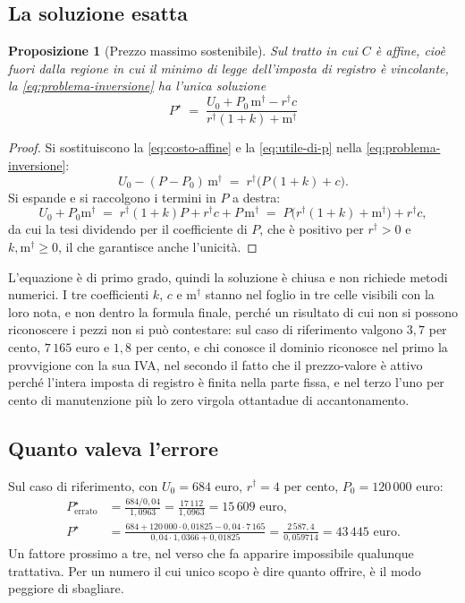 \documentclass[11pt,a4paper]{article}
\theoremstyle{definition}
\theoremstyle{plain}
\newtheorem{proposizione}[definizione]{Proposizione}
\begin{document}
\subsection{La soluzione esatta}

\begin{proposizione}[Prezzo massimo sostenibile]
Sul tratto in cui $C$ è affine, cioè fuori dalla regione in cui il minimo di legge dell'imposta di registro è vincolante, la \eqref{eq:problema-inversione} ha l'unica soluzione
\begin{equation}
\boxed{\;
P^\star \;=\; \frac{U_0 + P_0\,\mathrm{m}^\dagger - r^\dagger c}{r^\dagger (1+k) + \mathrm{m}^\dagger}\;}
\label{eq:pmax}
\end{equation}
\end{proposizione}

\begin{proof}
Si sostituiscono la \eqref{eq:costo-affine} e la \eqref{eq:utile-di-p} nella \eqref{eq:problema-inversione}:
\[
U_0 - (P-P_0)\,\mathrm{m}^\dagger \;=\; r^\dagger\big(P(1+k)+c\big).
\]
Si espande e si raccolgono i termini in $P$ a destra:
\[
U_0 + P_0 \mathrm{m}^\dagger \;=\; r^\dagger(1+k)P + r^\dagger c + P\,\mathrm{m}^\dagger
\;=\; P\big(r^\dagger(1+k)+\mathrm{m}^\dagger\big) + r^\dagger c,
\]
da cui la tesi dividendo per il coefficiente di $P$, che è positivo per $r^\dagger>0$ e $k,\mathrm{m}^\dagger \ge 0$, il che garantisce anche l'unicità.
\end{proof}

L'equazione è di primo grado, quindi la soluzione è chiusa e non richiede metodi numerici. I tre coefficienti $k$, $c$ e $\mathrm{m}^\dagger$ stanno nel foglio in tre celle visibili con la loro nota, e non dentro la formula finale, perché un risultato di cui non si possono riconoscere i pezzi non si può contestare: sul caso di riferimento valgono $3{,}7$ per cento, $7\,165$ euro e $1{,}8$ per cento, e chi conosce il dominio riconosce nel primo la provvigione con la sua IVA, nel secondo il fatto che il prezzo-valore è attivo perché l'intera imposta di registro è finita nella parte fissa, e nel terzo l'uno per cento di manutenzione più lo zero virgola ottantadue di accantonamento.

\subsection{Quanto valeva l'errore}

Sul caso di riferimento, con $U_0 = 684$ euro, $r^\dagger = 4$ per cento, $P_0 = 120\,000$ euro:
\begin{align*}
P^\star_{\text{errato}} &= \frac{684/0{,}04}{1{,}0963} = \frac{17\,112}{1{,}0963} = 15\,609 \text{ euro},\\
P^\star &= \frac{684 + 120\,000\cdot 0{,}01825 - 0{,}04\cdot 7\,165}{0{,}04\cdot 1{,}0366 + 0{,}01825} = \frac{2\,587{,}4}{0{,}059714} = 43\,445 \text{ euro}.
\end{align*}
Un fattore prossimo a tre, nel verso che fa apparire impossibile qualunque trattativa. Per un numero il cui unico scopo è dire quanto offrire, è il modo peggiore di sbagliare.
\end{document}
